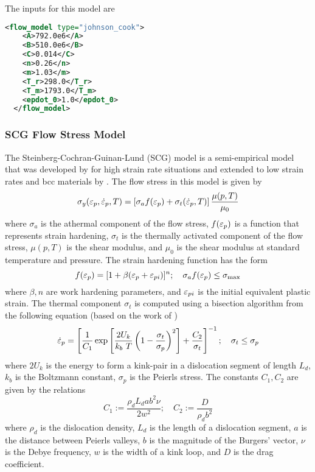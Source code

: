   The inputs for this model are
  \begin{lstlisting}[language=XML]
  <flow_model type="johnson_cook">
    <A>792.0e6</A>
    <B>510.0e6</B>
    <C>0.014</C>
    <n>0.26</n>
    <m>1.03</m>
    <T_r>298.0</T_r>
    <T_m>1793.0</T_m>
    <epdot_0>1.0</epdot_0>
  </flow_model>
  \end{lstlisting}

  \subsubsection{SCG Flow Stress Model}
  The Steinberg-Cochran-Guinan-Lund (SCG) model is a semi-empirical model
  that was developed by \cite{Steinberg80} for high strain rate
  situations and extended to low strain rates and bcc materials by
  \cite{Steinberg89}.  The flow stress in this model is given by
  \begin{equation}\label{eq:SCGL}
    \sigma_y(\varepsilon_p,\dot{\varepsilon}_{p},T) = 
     \left[\sigma_a f(\varepsilon_p) + \sigma_t (\dot{\varepsilon}_{p}, T)\right]
     \frac{\mu(p,T)}{\mu_0} 
  \end{equation}
  where $\sigma_a$ is the athermal component of the flow stress,
  $f(\varepsilon_p)$ is a function that represents strain hardening,
  $\sigma_t$ is the thermally activated component of the flow stress,
  $\mu(p,T)$ is the shear modulus, and $\mu_0$ is the shear modulus
  at standard temperature and pressure.  The strain hardening function
  has the form
  \begin{equation}
    f(\varepsilon_p) = [1 + \beta(\varepsilon_p + \varepsilon_{pi})]^n ; \quad
    \sigma_a f(\varepsilon_p) \le \sigma_{\text{max}}
  \end{equation}
  where $\beta, n$ are work hardening parameters, and $\varepsilon_{pi}$ is the
  initial equivalent plastic strain.  The thermal component $\sigma_t$
  is computed using a bisection algorithm from the following equation (based
  on the work of \cite{Hoge77})
  \begin{equation}
    \dot{\varepsilon}_{p} = \left[\frac{1}{C_1}\exp\left[\frac{2U_k}{k_b~T}
      \left(1 - \frac{\sigma_t}{\sigma_p}\right)^2\right] + 
      \frac{C_2}{\sigma_t}\right]^{-1}; \quad
    \sigma_t \le \sigma_p
  \end{equation}
  where $2 U_k$ is the energy to form a kink-pair in a dislocation segment
  of length $L_d$, $k_b$ is the Boltzmann constant, $\sigma_p$ is the Peierls
  stress. The constants $C_1, C_2$ are given by the relations
  \begin{equation}
    C_1 := \frac{\rho_d L_d a b^2 \nu}{2 w^2}; \quad
    C_2 := \frac{D}{\rho_d b^2}
  \end{equation}
  where $\rho_d$ is the dislocation density, $L_d$ is the length of a
  dislocation segment, $a$ is the distance between Peierls valleys,
  $b$ is the magnitude of the Burgers' vector, $\nu$ is the Debye frequency,
  $w$ is the width of a kink loop, and $D$ is the drag coefficient.

